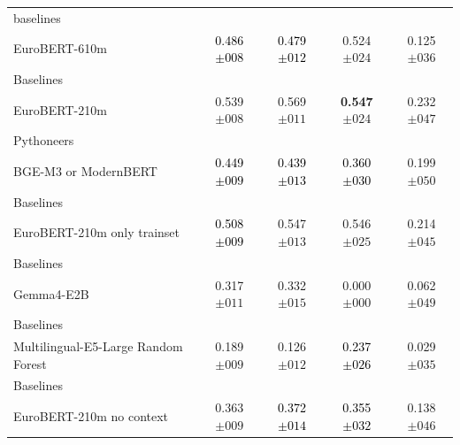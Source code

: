 \begin{tabularx}{\textwidth}{X | c c c c}
baselines\\\subcatarrow{}EuroBERT-610m & \textcolor{Black}{0.486$\pm{}008$} & \textcolor{Black}{0.479$\pm{}012$} & \textcolor{White!50!BrickRed}{0.524$\pm{}024$} & \textcolor{White!50!NavyBlue}{0.125$\pm{}036$} \\
Baselines\\\subcatarrow{}EuroBERT-210m & \textcolor{White!50!BrickRed}{0.539$\pm{}008$} & \textcolor{White!50!BrickRed}{0.569$\pm{}011$} & \textbf{\textcolor{BrickRed}{0.547$\pm{}024$}} & \textcolor{White!50!NavyBlue}{0.232$\pm{}047$} \\
Pythoneers\\\subcatarrow{}BGE-M3 or ModernBERT & \textcolor{Black}{0.449$\pm{}009$} & \textcolor{Black}{0.439$\pm{}013$} & \textcolor{Black}{0.360$\pm{}030$} & \textcolor{White!50!NavyBlue}{0.199$\pm{}050$} \\
Baselines\\\subcatarrow{}EuroBERT-210m only trainset & \textcolor{Black}{0.508$\pm{}009$} & \textcolor{White!50!BrickRed}{0.547$\pm{}013$} & \textcolor{BrickRed}{0.546$\pm{}025$} & \textcolor{White!50!NavyBlue}{0.214$\pm{}045$} \\
Baselines\\\subcatarrow{}Gemma4-E2B & \textcolor{White!50!NavyBlue}{0.317$\pm{}011$} & \textcolor{White!50!NavyBlue}{0.332$\pm{}015$} & \textcolor{NavyBlue}{0.000$\pm{}000$} & \textcolor{NavyBlue}{0.062$\pm{}049$} \\
Baselines\\\subcatarrow{}Multilingual-E5-Large Random Forest & \textcolor{NavyBlue}{0.189$\pm{}009$} & \textcolor{NavyBlue}{0.126$\pm{}012$} & \textcolor{Black}{0.237$\pm{}026$} & \textcolor{NavyBlue}{0.029$\pm{}035$} \\
Baselines\\\subcatarrow{}EuroBERT-210m no context & \textcolor{White!50!NavyBlue}{0.363$\pm{}009$} & \textcolor{Black}{0.372$\pm{}014$} & \textcolor{Black}{0.355$\pm{}032$} & \textcolor{White!50!NavyBlue}{0.138$\pm{}046$} \\
\hline
\end{tabularx}